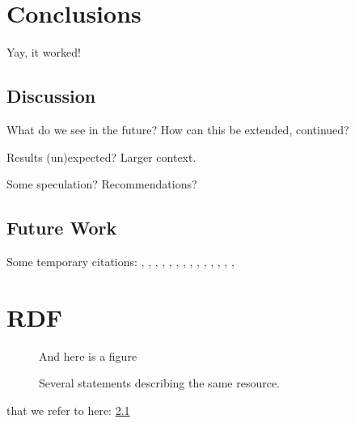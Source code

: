 \documentclass[a4paper,11pt]{kth-mag}
\begin{document}
\pagestyle{newchap}
\chapter{Conclusions}
Yay, it worked!


\section{Discussion}

What do we see in the future? How can this be extended, continued?

Results (un)expected? Larger context.

Some speculation? Recommendations?

\section{Future Work}


Some temporary citations:
\cite{hoare69}, \cite{floyd67}, \cite{pnueli77}, \cite{leucker09abriefaccount},
\cite{bauer06monitoring}, \cite{bauer08goodbadugly}, \cite{delgado04taxonomy},
\cite{meyer92applyingdbc}, \cite{rosenblum95practicalassertions},
\cite{bartetzko01jass}, \cite{bodden04lightweightltl},
\cite{bodden05efficientrv}, \cite{becksmalltalktesting}, \cite{fowlerxunit},
\cite{matusiak09aoppy}












\appendix
\addappheadtotoc
\chapter{RDF}\label{appA}

\begin{figure}[ht]
\begin{center}
And here is a figure
\caption{\small{Several statements describing the same resource.}}\label{RDF_4}
\end{center}
\end{figure}

that we refer to here: \ref{RDF_4}
\end{document}
